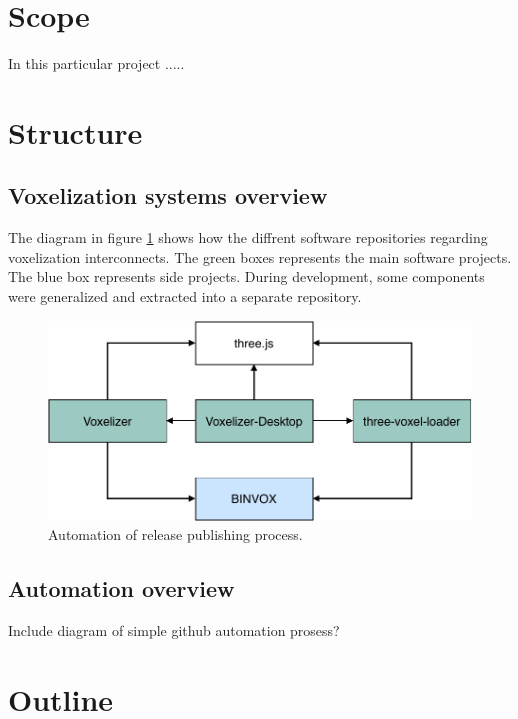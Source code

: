 \section{Scope}
In this particular project .....  

\section{Structure}
\subsection{Voxelization systems overview}
The diagram in figure \ref{fig:systems-overview} shows how the diffrent software repositories regarding voxelization interconnects. The green boxes represents the main software projects. The blue box represents side projects. During development, some components were generalized and extracted into a separate repository.
\clearpage %
\begin{figure}[h]
    \centering
    \includegraphics[page=1,scale=1]{sections/introduction/figures/systems-overview.pdf}
    \caption{Automation of release publishing process.}
    \label{fig:systems-overview}
\end{figure}

\subsection{Automation overview}
\colorbox{RubineRed}{Include diagram of simple github automation prosess?}

\section{Outline}

